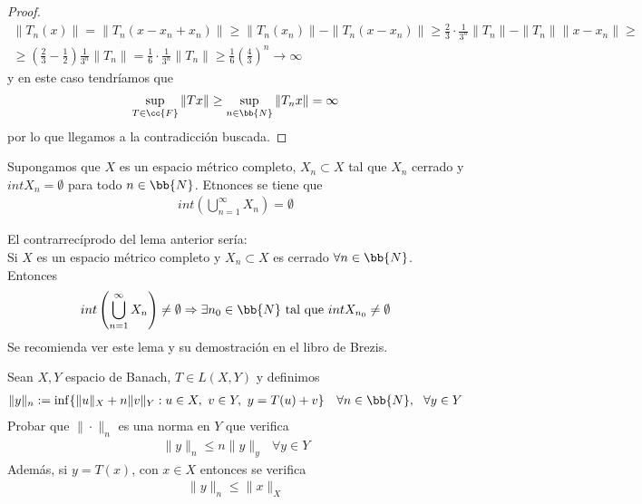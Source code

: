 \begin{prop}
\begin{proof}
\begin{gather*}
            \|T_n(x)\| = \| T_n(x-x_n+x_n)\| \geq \|T_n(x_n)\| - \|T_n(x-x_n)\| \geq \frac{2}{3} \cdot \frac{1}{3^n} \|T_n\| - \|T_n\|\|x - x_n\| \geq \\
            \geq \left(\frac{2}{3} - \frac{1}{2} \right) \frac{1}{3^n} \|T_n\| = \frac{1}{6} \cdot \frac{1}{3^n} \|T_n\| \geq \frac{1}{6}\left(\frac{4}{3}\right)^n \to \infty
        \end{gather*}
        y en este caso tendríamos que
        \begin{gather*}
            \sup_{T\in \cc{F}} \|Tx\| \geq \sup_{n\in \bb{N}} \|T_nx\| = \infty
        \end{gather*}
        por lo que llegamos a la contradicción buscada.
    \end{proof}
\end{prop}

\begin{lema} 
    Supongamos que $X$ es un espacio métrico completo, $X_n\subset X$ tal que $X_n$ cerrado y $int X_n = \emptyset$ para todo $n\in \bb{N}$. Etnonces se tiene que
    \begin{gather*}
        int \left(\bigcup\limits_{n=1}^\infty X_n\right) = \emptyset
    \end{gather*}
\end{lema}

\begin{observacion}
    El contrarrecíprodo del lema anterior sería:\\
    Si $X$ es un espacio métrico completo y $X_n\subset X$ es cerrado $\forall n\in \bb{N}$. Entonces
    \begin{gather*}
        int \left(\bigcup\limits_{n=1}^\infty X_n\right) \neq \emptyset \Rightarrow \exists n_0\in \bb{N} \text{ tal que } intX_{n_0}\neq \emptyset
    \end{gather*}
    Se recomienda ver este lema y su demostración en el libro de Brezis.
\end{observacion}


\begin{ejercicio}
    Sean $X,Y$ espacio de Banach, $T\in L(X,Y)$ y definimos
    \begin{gather*}
        \|y\|_n := \inf\{\|u\|_X+n \|v\|_Y: u\in X,\ v\in Y, \ y=T(u)+v\}\ \ \ \forall n \in \bb{N},\ \ \forall y \in Y
    \end{gather*}
    Probar que $\|\cdot\|_n$ es una norma en $Y$ que verifica
    \begin{gather*}
        \|y\|_n \leq n \|y\|_y \ \ \ \forall y \in Y
    \end{gather*}
    Además, si $y=T(x)$, con $x\in X$ entonces se verifica
    \begin{gather*}
        \|y\|_n \leq \|x\|_X
    \end{gather*}
\end{ejercicio}

